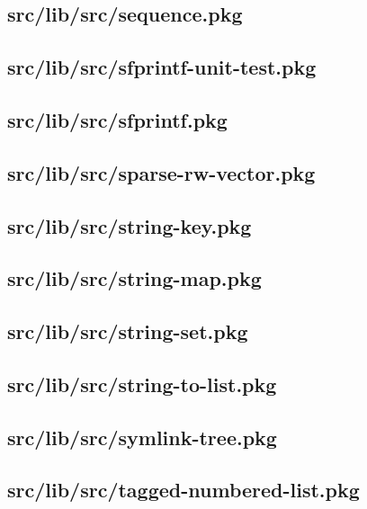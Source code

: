 \subsection{src/lib/src/sequence.pkg}


\subsection{src/lib/src/sfprintf-unit-test.pkg}


\subsection{src/lib/src/sfprintf.pkg}


\subsection{src/lib/src/sparse-rw-vector.pkg}


\subsection{src/lib/src/string-key.pkg}


\subsection{src/lib/src/string-map.pkg}


\subsection{src/lib/src/string-set.pkg}


\subsection{src/lib/src/string-to-list.pkg}


\subsection{src/lib/src/symlink-tree.pkg}


\subsection{src/lib/src/tagged-numbered-list.pkg}


